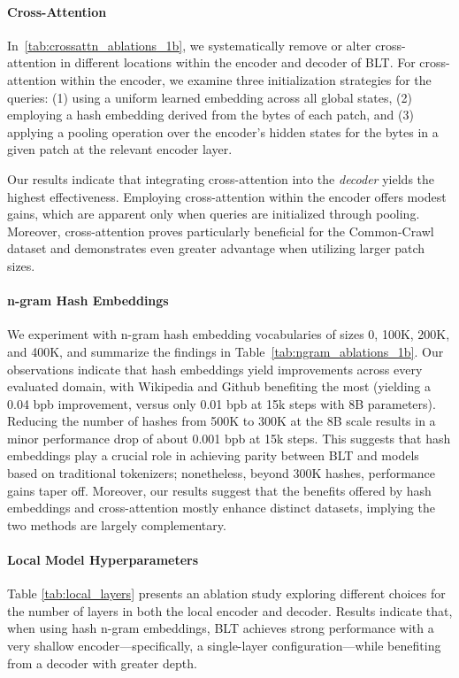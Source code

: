 \paragraph{Cross-Attention} 
In~\autoref{tab:crossattn_ablations_1b}, we systematically remove or alter cross-attention in different locations within the encoder and decoder of {\textsc BLT}. For cross-attention within the encoder, we examine three initialization strategies for the queries: (1) using a uniform learned embedding across all global states, (2) employing a hash embedding derived from the bytes of each patch, and (3) applying a pooling operation over the encoder's hidden states for the bytes in a given patch at the relevant encoder layer.

Our results indicate that integrating cross-attention into the \textit{decoder} yields the highest effectiveness. Employing cross-attention within the encoder offers modest gains, which are apparent only when queries are initialized through pooling. Moreover, cross-attention proves particularly beneficial for the Common-Crawl dataset and demonstrates even greater advantage when utilizing larger patch sizes.

\paragraph{n-gram Hash Embeddings} 

We experiment with n-gram hash embedding vocabularies of sizes 0, 100K, 200K, and 400K, and summarize the findings in Table~\ref{tab:ngram_ablations_1b}. Our observations indicate that hash embeddings yield improvements across every evaluated domain, with Wikipedia and Github benefiting the most (yielding a 0.04 bpb improvement, versus only 0.01 bpb at 15k steps with 8B parameters). Reducing the number of hashes from 500K to 300K at the 8B scale results in a minor performance drop of about 0.001 bpb at 15k steps. This suggests that hash embeddings play a crucial role in achieving parity between {\textsc BLT} and models based on traditional tokenizers; nonetheless, beyond 300K hashes, performance gains taper off. Moreover, our results suggest that the benefits offered by hash embeddings and cross-attention mostly enhance distinct datasets, implying the two methods are largely complementary.

\paragraph{Local Model Hyperparameters} Table \ref{tab:local_layers} presents an ablation study exploring different choices for the number of layers in both the local encoder and decoder. Results indicate that, when using hash n-gram embeddings, {\textsc BLT} achieves strong performance with a very shallow encoder—specifically, a single-layer configuration—while benefiting from a decoder with greater depth.


